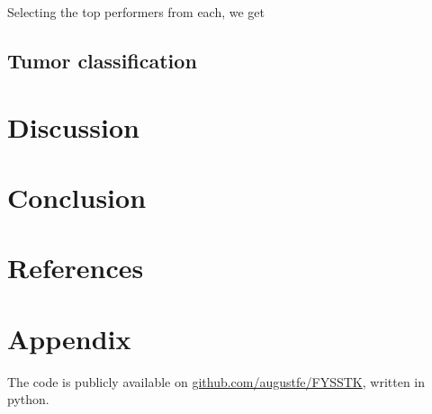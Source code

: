 \documentclass{article}
\theoremstyle{definition}
\begin{document}
Selecting the top performers from each, we get



\subsection{Tumor classification}

\newpage
\section{Discussion}

\section{Conclusion}

\section{References}

\printbibliography

\section{Appendix}
The code is publicly available on \href{https://github.com/augustfe/FYSSTK}{github.com/augustfe/FYSSTK}, written in python.
\end{document}

